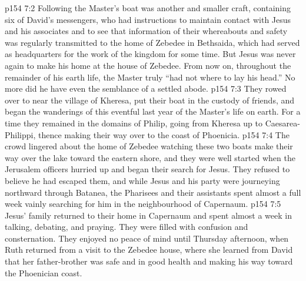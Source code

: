 \vs p154 7:2 Following the Master’s boat was another and smaller craft, containing six of David’s messengers, who had instructions to maintain contact with Jesus and his associates and to see that information of their whereabouts and safety was regularly transmitted to the home of Zebedee in Bethsaida, which had served as headquarters for the work of the kingdom for some time. But Jesus was never again to make his home at the house of Zebedee. From now on, throughout the remainder of his earth life, the Master truly “had not where to lay his head.” No more did he have even the semblance of a settled abode.
\vs p154 7:3 They rowed over to near the village of Kheresa, put their boat in the custody of friends, and began the wanderings of this eventful last year of the Master’s life on earth. For a time they remained in the domains of Philip, going from Kheresa up to Caesarea\hyp{}Philippi, thence making their way over to the coast of Phoenicia.
\vs p154 7:4 \pc The crowd lingered about the home of Zebedee watching these two boats make their way over the lake toward the eastern shore, and they were well started when the Jerusalem officers hurried up and began their search for Jesus. They refused to believe he had escaped them, and while Jesus and his party were journeying northward through Batanea, the Pharisees and their assistants spent almost a full week vainly searching for him in the neighbourhood of Capernaum.
\vs p154 7:5 Jesus’ family returned to their home in Capernaum and spent almost a week in talking, debating, and praying. They were filled with confusion and consternation. They enjoyed no peace of mind until Thursday afternoon, when Ruth returned from a visit to the Zebedee house, where she learned from David that her father\hyp{}brother was safe and in good health and making his way toward the Phoenician coast.
\quizlink
